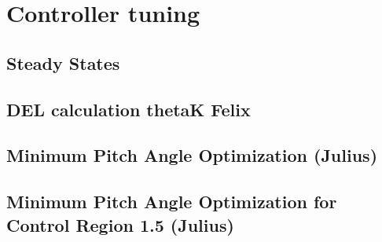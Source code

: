\chapter{Controller tuning}
\section{Steady States} \label{steady states}

\section{DEL calculation thetaK Felix}

\section{Minimum Pitch Angle Optimization (Julius)} \label{minimum pitch angle static}


\section{Minimum Pitch Angle Optimization for Control Region 1.5 (Julius)} 

